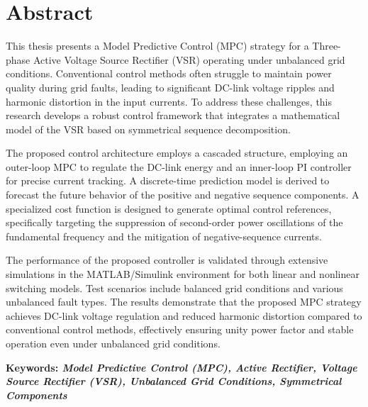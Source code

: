\chapter*{Abstract}
This thesis presents a Model Predictive Control (MPC) strategy for a Three-phase Active Voltage Source Rectifier (VSR)
operating under unbalanced grid conditions. Conventional control methods often struggle to maintain 
power quality during grid faults, leading to significant DC-link voltage ripples and harmonic distortion in the input
currents. To address these challenges, this research develops a robust control framework that integrates a mathematical
model of the VSR based on symmetrical sequence decomposition.\par
The proposed control architecture employs a cascaded structure, employing an outer-loop MPC to regulate the DC-link energy
and an inner-loop PI controller for precise current tracking. A discrete-time prediction model is
derived to forecast the future behavior of the positive and negative sequence components. A specialized cost function
is designed to generate optimal control references, specifically targeting the suppression of second-order
power oscillations of the fundamental frequency and the mitigation of negative-sequence currents.\par
The performance of the proposed controller is validated through extensive simulations in the MATLAB/Simulink environment
for both linear and nonlinear switching models. Test scenarios include balanced grid conditions and various unbalanced
fault types. The results demonstrate that the proposed MPC strategy achieves DC-link voltage regulation and
reduced harmonic distortion compared to conventional control methods, effectively ensuring unity power factor and stable
operation even under unbalanced grid conditions.\par
\bigskip

\textbf{Keywords: \textit{Model Predictive Control (MPC), Active Rectifier, Voltage Source Rectifier (VSR),
 Unbalanced Grid Conditions, Symmetrical Components}}

